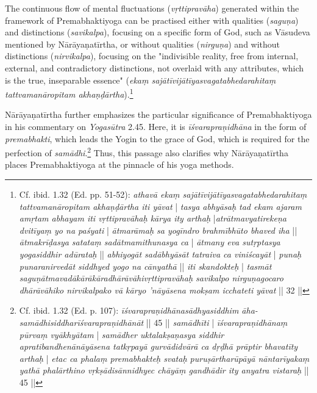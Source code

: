 The continuous flow of mental fluctuations (\textit{vṛttipravāha}) generated within the framework of Premabhaktiyoga can be practised either with qualities (\textit{saguṇa}) and distinctions (\textit{savikalpa}), focusing on a specific form of God, such as Vāsudeva mentioned by Nārāyaṇatīrtha, or without qualities (\textit{nirguṇa}) and without distinctions (\textit{nirvikalpa}), focusing on the "indivisible reality, free from internal, external, and contradictory distinctions, not overlaid with any attributes, which is the true, inseparable essence" (\textit{ekaṃ sajātīvijātīyasvagatabhedarahitaṃ tattvamanāropitam akhaṇḍārtha}).\footnote{Cf. ibid. 1.32 (Ed. pp. 51-52): \textit{athavā ekaṃ sajātīvijātīyasvagatabhedarahitaṃ tattvamanāropitam akhaṇḍārtha iti yāvat} | \textit{tasya abhyāsaḥ tad ekam ajaram amṛtam abhayam iti vṛttipravāhaḥ kārya ity arthaḥ} |\textit{atrātmavyatirekeṇa dvitīyaṃ yo na paśyati} | \textit{ātmarāmaḥ sa yogīndro brahmībhūto bhaved iha} || \textit{ātmakrīḍasya satataṃ sadātmamithunasya ca} | \textit{ātmany eva sutṛptasya yogasiddhir adūrataḥ} || \textit{abhiyogāt sadābhyāsāt tatraiva ca viniścayāt} | \textit{punaḥ punaranirvedāt siddhyed yogo na cānyathā} || \textit{iti skandokteḥ} | \textit{tasmāt saguṇātmavadākārākāradhārāvāhivṛttipravāhaḥ savikalpo nirguṇagocaro dhārāvāhiko nirvikalpako vā kāryo 'nāyāsena mokṣam icchateti yāvat} || 32 ||}

Nārāyaṇatīrtha further emphasizes the particular significance of Premabhaktiyoga in his commentary on \textit{Yogasūtra} 2.45. Here, it is \textit{īśvarapraṇidhāna} in the form of \textit{premabhakti}, which leads the Yogin to the grace of God, which is required for the perfection of \textit{samādhi}.\footnote{Cf. ibid. 1.32 (Ed. p. 107): \textit{īśvarapraṇidhānasādhyasiddhim āha- samādhisiddharīśvarapraṇidhānāt} || 45 || \textit{samādhīti} | \textit{īśvarapraṇidhānaṃ pūrvaṃ vyākhyātam} | \textit{samādher uktalakṣaṇasya siddhir apratibandhenānāyāsena tatkṛpayā gurvādidvārā ca dṛḍhā prāptir bhavatīty arthaḥ} | \textit{etac ca phalaṃ premabhakteḥ svataḥ puruṣārtharūpāyā nāntarīyakaṃ yathā phalārthino vṛkṣādisānnidhyec chāyāṃ gandhādir ity anyatra vistaraḥ} || 45 ||} Thus, this passage also clarifies why Nārāyaṇatīrtha places Premabhaktiyoga at the pinnacle of his yoga methods.

